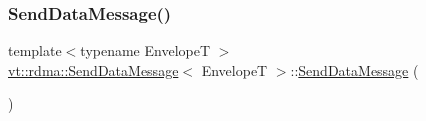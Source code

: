 \subsubsection{\texorpdfstring{Send\+Data\+Message()}{SendDataMessage()}\hspace{0.1cm}{\footnotesize\ttfamily [1/2]}}
{\footnotesize\ttfamily template$<$typename EnvelopeT $>$ \\
\hyperlink{structvt_1_1rdma_1_1_send_data_message}{vt\+::rdma\+::\+Send\+Data\+Message}$<$ EnvelopeT $>$\+::\hyperlink{structvt_1_1rdma_1_1_send_data_message}{Send\+Data\+Message} (\begin{DoxyParamCaption}{ }\end{DoxyParamCaption})\hspace{0.3cm}{\ttfamily [default]}}

\mbox{\label{structvt_1_1rdma_1_1_send_data_message_aa40145bdda8af458d6202927a5a72255}} 
